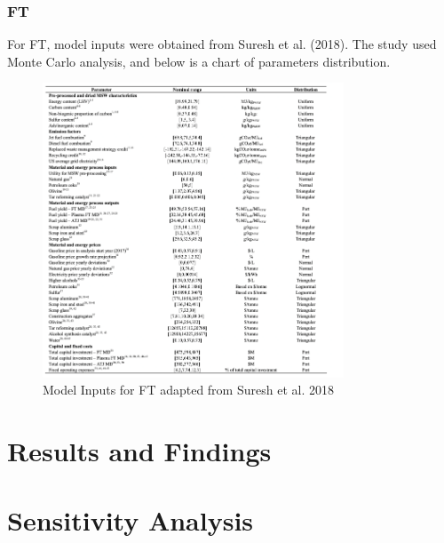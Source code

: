 \documentclass[12pt]{article}
\begin{document}
\begin{Appendix}
\begin{table}[H]

\end{table}

\subsubsection{FT}

For FT, model inputs were obtained from Suresh et al. (2018). The study used Monte Carlo analysis, and below is a chart of parameters distribution. 

\begin{figure}[H]
    \centering
    \includegraphics[width=0.8\textwidth]{FT Data.png} %
    \caption{Model Inputs for FT adapted from Suresh et al. 2018}
    \label{fig:Fisher} %
\end{figure}




\section{Results and Findings}

\section{Sensitivity Analysis}


\end{Appendix}
\end{document}

